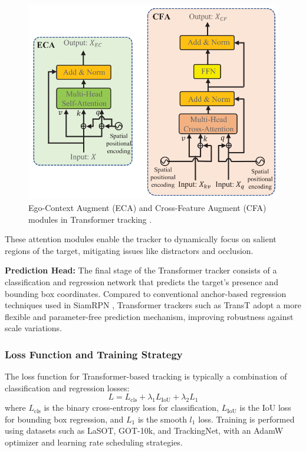 \begin{figure}[h]
    \centering
    \includegraphics[width=0.8\linewidth]{images/ecs-cfa.png}
    \caption{Ego-Context Augment (ECA) and Cross-Feature Augment (CFA) modules in Transformer tracking \cite{chen2021transformer}.}
    \label{fig:eca_cfa}
\end{figure}

These attention modules enable the tracker to dynamically focus on salient regions of the target, mitigating issues like distractors and occlusion.

\textbf{Prediction Head: }The final stage of the Transformer tracker consists of a classification and regression network that predicts the target's presence and bounding box coordinates. Compared to conventional anchor-based regression techniques used in SiamRPN \cite{li2018high}, Transformer trackers such as TransT \cite{chen2021transformer} adopt a more flexible and parameter-free prediction mechanism, improving robustness against scale variations.

\subsubsection{Loss Function and Training Strategy}
The loss function for Transformer-based tracking is typically a combination of classification and regression losses:
\begin{equation}
L = L_{\text{cls}} + \lambda_{1} L_{\text{IoU}} + \lambda_{2} L_{1}
\end{equation}
where $L_{\text{cls}}$ is the binary cross-entropy loss for classification, $L_{\text{IoU}}$ is the IoU loss for bounding box regression, and $L_{1}$ is the smooth $l_1$ loss. Training is performed using datasets such as LaSOT, GOT-10k, and TrackingNet, with an AdamW optimizer and learning rate scheduling strategies.

